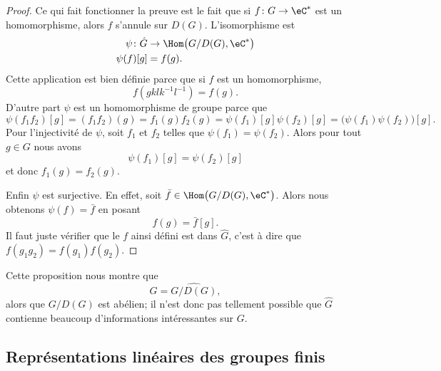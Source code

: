 \begin{proof}
    Ce qui fait fonctionner la preuve est le fait que si \( f\colon G\to \eC^*\) est un homomorphisme, alors \( f\) s'annule sur \( D(G)\). L'isomorphisme est
    \begin{equation}
        \begin{aligned}
            \psi\colon \hat G&\to \Hom\big( G/D(G),\eC^* \big) \\
            \psi(f)[g]&=f(g). 
        \end{aligned}
    \end{equation}
    Cette application est bien définie parce que si \( f\) est un homomorphisme,
    \begin{equation}
        f(gklk^{-1}l^{-1})=f(g).
    \end{equation}
    D'autre part \( \psi\) est un homomorphisme de groupe parce que
    \begin{equation}
        \psi(f_1f_2)[g]=(f_1f_2)(g)=f_1(g)f_2(g)=\psi(f_1)[g]\psi(f_2)[g]=\big( \psi(f_1)\psi(f_2) \big)[g].
    \end{equation}
    Pour l'injectivité de \( \psi\), soit \( f_1\) et \( f_2\) telles que \( \psi(f_1)=\psi(f_2)\). Alors pour tout \( g\in G\) nous avons
    \begin{equation}
        \psi(f_1)[g]=\psi(f_2)[g]
    \end{equation}
    et donc \( f_1(g)=f_2(g)\).

    Enfin \( \psi\) est surjective. En effet, soit \( \bar f\in\Hom\big( G/D(G),\eC^* \big)\). Alors nous obtenons \( \psi(f)=\bar f\) en posant
    \begin{equation}
        f(g)=\bar f[g].
    \end{equation}
    Il faut juste vérifier que le \( f\) ainsi défini est dans \( \hat G\), c'est à dire que \( f(g_1g_2)=f(g_1)f(g_2)\).
\end{proof}

Cette proposition nous montre que
\begin{equation}
    \hat G=\widehat{G/D(G)},
\end{equation}
alors que \( G/D(G)\) est abélien; il n'est donc pas tellement possible que \( \hat G\) contienne beaucoup d'informations intéressantes sur \( G\).

\subsection{Représentations linéaires des groupes finis}

